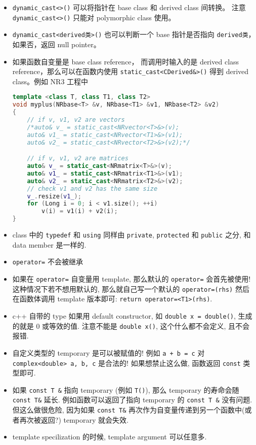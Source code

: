 \begin{itemize}
\item \verb|dynamic_cast<>()| 可以将指针在 base class 和 derived class 间转换。 注意 \verb|dynamic_cast<>()| 只能对 polymorphic class 使用。
\item \verb|dynamic_cast<derived类>()| 也可以判断一个 base 指针是否指向 \verb|derived类|， 如果否，返回 null pointer。
\item 如果函数自变量是 base class reference， 而调用时输入的是 derived class reference，那么可以在函数内使用 \verb|static_cast<CDerived&>()| 得到 derived class。例如 NR3 工程中
\begin{lstlisting}[language=cpp]
template <class T, class T1, class T2>
void myplus(NRbase<T> &v, NRbase<T1> &v1, NRbase<T2> &v2)
{
	// if v, v1, v2 are vectors
	/*auto& v_ = static_cast<NRvector<T>&>(v);
	auto& v1_ = static_cast<NRvector<T1>&>(v1);
	auto& v2_ = static_cast<NRvector<T2>&>(v2);*/

	// if v, v1, v2 are matrices
	auto& v_ = static_cast<NRmatrix<T>&>(v);
	auto& v1_ = static_cast<NRmatrix<T1>&>(v1);
	auto& v2_ = static_cast<NRmatrix<T2>&>(v2);
	// check v1 and v2 has the same size
	v_.resize(v1_);
	for (Long i = 0; i < v1.size(); ++i)
		v(i) = v1(i) + v2(i);
}
\end{lstlisting}

\item class 中的 \verb`typedef` 和 \verb`using` 同样由 \verb`private`, \verb`protected` 和 \verb`public` 之分, 和 data member 是一样的.
\item \verb`operator=` 不会被继承
\item 如果在 \verb`operator=` 自变量用 template, 那么默认的 \verb`operator=` 会首先被使用! 这种情况下若不想用默认的, 那么就自己写一个默认的 \verb`operator=(rhs)` 然后在函数体调用 template 版本即可: \verb`return operator=<T1>(rhs)`.
\item c++ 自带的 type 如果用 default constructor, 如 \verb`double x = double()`, 生成的就是 0 或等效的值. 注意不能是 \verb`double x()`, 这个什么都不会定义, 且不会报错.
\item 自定义类型的 temporary 是可以被赋值的! 例如 \verb`a + b = c` 对 \verb`complex<double> a, b, c` 是合法的! 如果想禁止这么做, 函数返回 \verb`const` 类型即可.
\item 如果 \verb`const T &` 指向 temporary (例如 \verb`T()`), 那么 temporary 的寿命会随 \verb`const T&` 延长. 例如函数可以返回了指向 temporary 的 \verb`const T &` 没有问题. 但这么做很危险, 因为如果 \verb`const T&` 再次作为自变量传递到另一个函数中(或者再次被返回?) temporary 就会失效.
\item template specilization 的时候, template argument 可以任意多.
\end{itemize}
